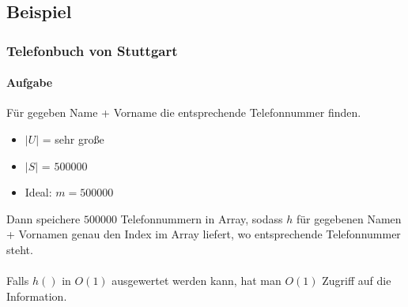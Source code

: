 \subsection{Beispiel}
\subsubsection*{Telefonbuch von Stuttgart}
\paragraph*{Aufgabe} Für gegeben Name + Vorname die entsprechende Telefonnummer finden.
\begin{itemize}
	\item $|U|$ = sehr große
	\item $|S|$ = $500 000$
	\item Ideal: $m = 500 000$
\end{itemize}
Dann speichere $500 000$ Telefonnummern in Array, sodass $h$ für gegebenen Namen + Vornamen genau den Index im Array liefert, wo entsprechende Telefonnummer steht.

\paragraph*{} Falls $h()$ in $O(1)$ ausgewertet werden kann, hat man $O(1)$ Zugriff auf die Information.